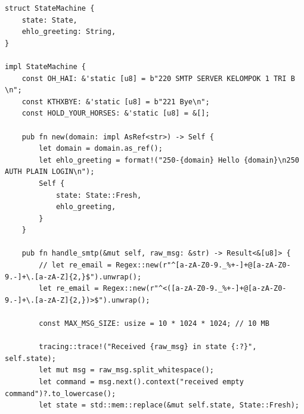\documentclass[12pt, a4paper]{article}
\begin{document}
\begin{enumerate}
\begin{verbatim}
struct StateMachine {
    state: State,
    ehlo_greeting: String,
}

impl StateMachine {
    const OH_HAI: &'static [u8] = b"220 SMTP SERVER KELOMPOK 1 TRI B \n";
    const KTHXBYE: &'static [u8] = b"221 Bye\n";
    const HOLD_YOUR_HORSES: &'static [u8] = &[];

    pub fn new(domain: impl AsRef<str>) -> Self {
        let domain = domain.as_ref();
        let ehlo_greeting = format!("250-{domain} Hello {domain}\n250 AUTH PLAIN LOGIN\n");
        Self {
            state: State::Fresh,
            ehlo_greeting,
        }
    }

    pub fn handle_smtp(&mut self, raw_msg: &str) -> Result<&[u8]> {
        // let re_email = Regex::new(r"^[a-zA-Z0-9._%+-]+@[a-zA-Z0-9.-]+\.[a-zA-Z]{2,}$").unwrap();
        let re_email = Regex::new(r"^<([a-zA-Z0-9._%+-]+@[a-zA-Z0-9.-]+\.[a-zA-Z]{2,})>$").unwrap();

        const MAX_MSG_SIZE: usize = 10 * 1024 * 1024; // 10 MB

        tracing::trace!("Received {raw_msg} in state {:?}", self.state);
        let mut msg = raw_msg.split_whitespace();
        let command = msg.next().context("received empty command")?.to_lowercase();
        let state = std::mem::replace(&mut self.state, State::Fresh);


\end{verbatim}
\end{enumerate}
\end{document}
